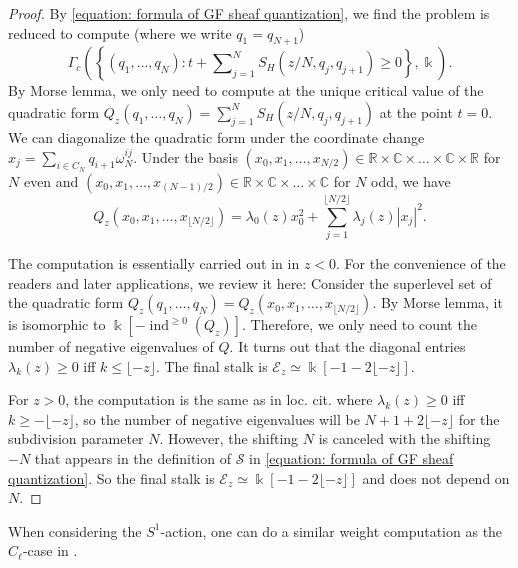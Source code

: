 \documentclass[11pt]{amsart}
\numberwithin{equation}{section}
\theoremstyle{plain}
\theoremstyle{definition}
\theoremstyle{remark}
\newcommand{\bC} { {\mathbb{C}}}
\newcommand{\bR} { {\mathbb{R}}}
\newcommand{\cE} { {\mathcal{E}}}
\newcommand{\cS} { {\mathcal{S}}}
\begin{document}
\begin{proof}By \autoref{equation: formula of GF sheaf quantization}, we find the problem is reduced to compute (where we write $q_1 = q_{N+1}$)
\[\Gamma_c\left(\left\{(q_1,\dots,q_{N}):t+\sum\nolimits_{j=1}^N S_{H}(z/N,q_j,q_{j+1})\geq 0\right\},\Bbbk \right).\]
By Morse lemma, we only need to compute at the unique critical value of the quadratic form $Q_z(q_1,\dots,q_{N}) = \sum_{j=1}^NS_H(z/N, q_j, q_{j+1})$ at the point $t=0$. We can diagonalize the quadratic form under the coordinate change $x_j = \sum_{i \in C_N}q_{i+1}\omega^{ij}_N$. Under the basis $(x_0, x_1, \dots, x_{N/2}) \in \bR \times \bC \times \dots \times \bC \times \bR$ for $N$ even and $(x_0, x_1, \dots, x_{(N-1)/2}) \in \bR \times \bC \times \dots \times \bC$ for $N$ odd, we have \cite[Equation (3.17)]{Capacities2021}
\[Q_z(x_0,x_1, \dots, x_{\lfloor N/2\rfloor}) = \lambda_0(z)x_0^2 + \sum_{j=1}^{\lfloor N/2\rfloor}\lambda_j(z)|x_j|^2.\]

The computation is essentially carried out in \cite[Section 3.3]{Capacities2021} in $z<0$. For the convenience of the readers and later applications, we review it here: Consider the superlevel set of the quadratic form $Q_z(q_1,\dots,q_{N}) = Q_z(x_0,x_1, \dots, x_{\lfloor N/2\rfloor})$.
By Morse lemma, it is isomorphic to $\Bbbk [-\operatorname{ind}^{\geq0}(Q_z)]$. Therefore, we only need to count the number of negative eigenvalues of $Q$. It turns out that the diagonal entries $\lambda_k(z) \geq 0$ iff $k \leq \lfloor -z \rfloor$. The final stalk is $\cE_{z}\simeq \Bbbk [-1-2\lfloor -z\rfloor]$.

For $z>0$, the computation is the same as in loc. cit. where $\lambda_k(z) \geq 0$ iff $k \geq -\lfloor -z \rfloor$, so the number of negative eigenvalues will be $N+1+2\lfloor -z\rfloor$ for the subdivision parameter $N$. However, the shifting $N$ is canceled with the shifting $-N$ that appears in the definition of $\cS$ in \autoref{equation: formula of GF sheaf quantization}. So the final stalk is $\cE_{z}\simeq \Bbbk [-1-2\lfloor -z\rfloor]$ and does not depend on $N$.
\end{proof}

When considering the $S^1$-action, one can do a similar weight computation as the $C_\ell$-case in \cite[Section 3.3, after Proposition 3.11]{Capacities2021} \cite[after Proposition 4.12]{zhangthesis}.
\end{document}
